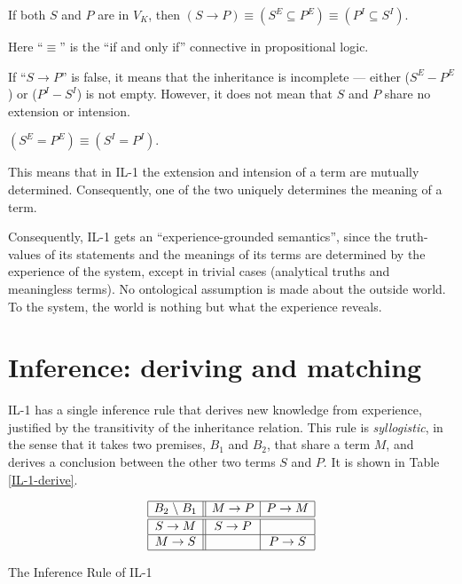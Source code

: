 \begin{theo}
If both $S$ and $P$ are in $V_K$, then 
\((S \rightarrow P) \equiv (S^E \subseteq P^E) \equiv (P^I \subseteq S^I)\).
\end{theo}
Here ``$\equiv$'' is the ``if and only if'' connective in propositional logic. 

If ``\(S \rightarrow P\)'' is false, it means that the inheritance is incomplete --- either (\(S^E - P^E\)) or (\(P^I - S^I\)) is not empty.  However, it does not mean that $S$ and $P$ share no extension or intension.

\begin{theo}
\((S^E = P^E) \equiv (S^I = P^I).\)
\end{theo}
This means that in IL-1 the extension and intension of a term are mutually determined. Consequently, one of the two uniquely determines the meaning of a term.

Consequently, IL-1 gets an ``experience-grounded semantics'', since the truth-values of its statements and the meanings of its terms are determined by the experience of the system, except in trivial cases (analytical truths and meaningless terms). No ontological assumption is made about the outside world. To the system, the world is nothing but what the experience reveals.

\section{Inference: deriving and matching}

IL-1 has a single inference rule that derives new knowledge from experience, justified by the transitivity of the inheritance relation. This rule is \emph{syllogistic}, in the sense that it takes two premises, $B_1$ and $B_2$, that share a term $M$, and derives a conclusion between the other two terms $S$ and $P$. It is shown in Table \ref{IL-1-derive}.

\begin{table}[htb]
\[\begin{array}{|c||c|c|} \hline
B_2 \; \backslash \; B_1  & M \rightarrow P & P \rightarrow M \\
\hline \hline
S \rightarrow M & S \rightarrow P  &   \\
\hline
M \rightarrow S &  & P \rightarrow S \\
\hline \end{array}\]
\caption{The Inference Rule of IL-1}
\label{IL-1-derive}
\end{table}

